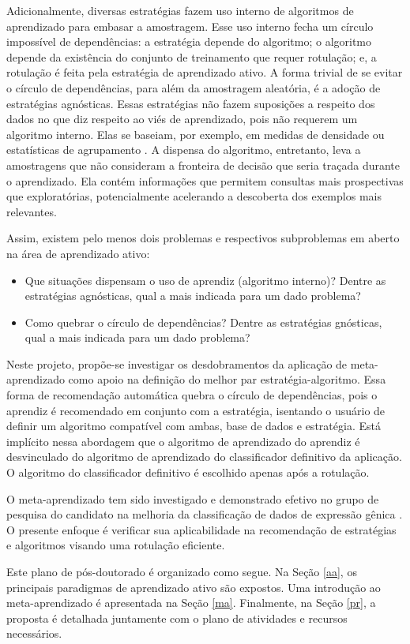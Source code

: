 Adicionalmente, diversas estratégias fazem uso interno de algoritmos de aprendizado para
embasar a amostragem.
Esse uso interno fecha um círculo impossível de dependências:
a estratégia depende do algoritmo; o algoritmo depende da existência do conjunto
de treinamento que requer rotulação; e,
a rotulação é feita pela estratégia de aprendizado ativo.
A forma trivial de se evitar o círculo de dependências, para além da amostragem aleatória,
é a adoção de estratégias agnósticas.
Essas estratégias não fazem suposições a respeito dos dados no que diz respeito ao viés de
aprendizado, pois não requerem um algoritmo interno.
Elas se baseiam, por exemplo, em medidas de densidade ou estatísticas de agrupamento
\citep{journals/tcs/Dasgupta11}.
A dispensa do algoritmo, entretanto, leva a amostragens que não consideram a fronteira
de decisão que seria traçada durante o aprendizado.
Ela contém informações que permitem consultas mais prospectivas que exploratórias,
potencialmente acelerando a descoberta dos exemplos mais relevantes.

Assim, existem pelo menos dois problemas e respectivos subproblemas em aberto na área
de aprendizado ativo:
\begin{itemize}
 \item Que situações dispensam o uso de aprendiz (algoritmo interno)?
 Dentre as estratégias agnósticas, qual a mais indicada para um dado problema?
 \item Como quebrar o círculo de dependências?
 Dentre as estratégias gnósticas, qual a mais indicada para um dado problema?
\end{itemize}

Neste projeto, propõe-se investigar os desdobramentos da aplicação de meta-aprendizado como apoio 
na definição do melhor par estratégia-algoritmo.
Essa forma de recomendação automática quebra o círculo de dependências, pois o aprendiz é recomendado em
conjunto com a estratégia, isentando o usuário de definir um algoritmo compatível com
ambas, base de dados e estratégia.
Está implícito nessa abordagem que o algoritmo de aprendizado do aprendiz é desvinculado
do algoritmo de aprendizado do classificador definitivo da aplicação.
O algoritmo do classificador definitivo é escolhido apenas após a rotulação.

O meta-aprendizado tem sido investigado e demonstrado efetivo no grupo de pesquisa
do candidato na melhoria da classificação de dados de expressão gênica
\cite{souza2010c,souza2010b,souza2009,1442541}.
O presente enfoque é verificar sua aplicabilidade na recomendação de estratégias e algoritmos visando uma rotulação eficiente.

 Este plano de pós-doutorado é organizado como segue.
 Na Seção \ref{aa}, os principais paradigmas de aprendizado ativo são expostos.
Uma introdução ao meta-aprendizado é apresentada na Seção \ref{ma}.
Finalmente, na Seção \ref{pr}, a proposta é detalhada juntamente com o plano de atividades e recursos necessários.
